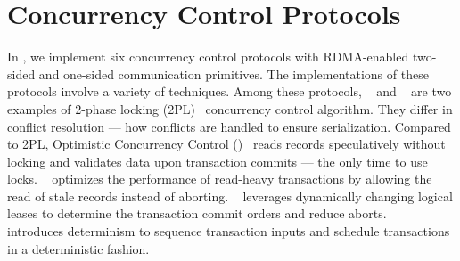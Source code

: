 \section{Concurrency Control Protocols}





In \projectname, we implement six concurrency control protocols 
with RDMA-enabled
two-sided and one-sided communication primitives. 
The implementations of these protocols
involve a variety of techniques. 
Among these protocols,
\nowait~\cite{Bernstein:1981:CCD:356842.356846} and \waitdie~\cite{Bernstein:1981:CCD:356842.356846} are two examples of 2-phase locking (2PL)~\cite{Bernstein:1981:CCD:356842.356846} 
concurrency control algorithm.
They differ in conflict resolution --- how conflicts are handled to ensure serialization. 
Compared to 2PL, Optimistic Concurrency Control (\occ)~\cite{kung1981optimistic} reads records speculatively without locking and 
validates data upon transaction commits 
--- the only time to use locks. 
\mvcc~\cite{bernstein1983multiversion} optimizes the performance of read-heavy transactions by allowing the read of stale records instead of aborting. \sundial~\cite{yu2018sundial} leverages dynamically changing logical leases to determine the transaction commit orders and reduce aborts. 
\calvin~\cite{Thomson:2012:CFD:2213836.2213838} introduces determinism to sequence transaction inputs and schedule transactions in a deterministic fashion. 


